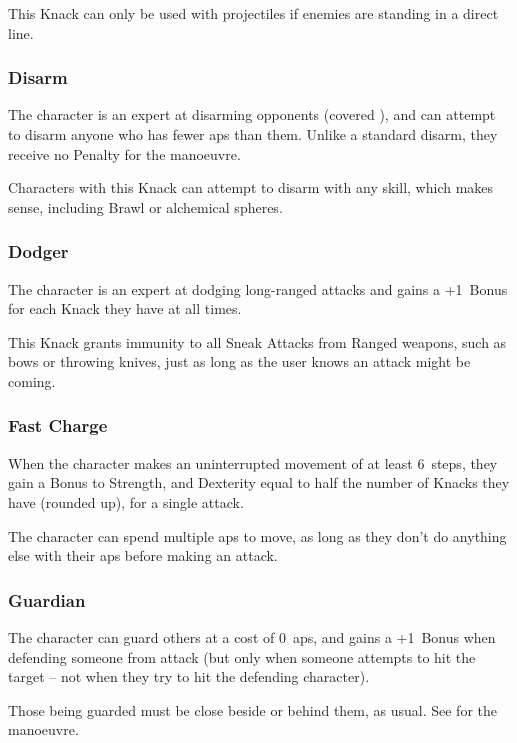 \begin{multicols}{2}
This Knack can only be used with \gls{projectiles} if enemies are standing in a direct line.

\subsubsection{Disarm}

The character is an expert at disarming opponents (covered ), and can attempt to disarm anyone who has fewer \glspl{ap} than them.
Unlike a standard disarm, they receive no Penalty for the manoeuvre.

Characters with this Knack can attempt to disarm with any \gls{skill}, which makes sense, including Brawl or alchemical \glspl{sphere}.

\subsubsection{Dodger}
\label{dodger}

The character is an expert at dodging long-ranged attacks and gains a +1~Bonus for each Knack they have at all times.

This Knack grants immunity to all Sneak Attacks from Ranged weapons, such as bows or throwing knives, just as long as the user knows an attack might be coming.

\subsubsection{Fast Charge}

When the character makes an uninterrupted movement of at least 6~\glspl{step}, they gain a Bonus to Strength, and Dexterity equal to half the number of Knacks they have (rounded up), for a single attack.

The character can spend multiple \glspl{ap} to move, as long as they don't do anything else with their \glspl{ap} before making an attack.

\subsubsection{Guardian}

The character can guard others at a cost of 0~\glspl{ap}, and gains a +1~Bonus when defending someone from attack (but only when someone attempts to hit the target -- not when they try to hit the defending character).

Those being guarded must be close beside or behind them, as usual.
See  for the manoeuvre.


\end{multicols}
